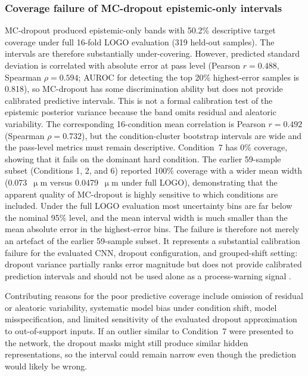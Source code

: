 \subsubsection{Coverage failure of MC-dropout epistemic-only intervals}\label{why-mc-dropout-fails}

MC-dropout produced epistemic-only bands with 50.2\% descriptive target coverage
under full 16-fold LOGO evaluation (319 held-out samples). The intervals
are therefore substantially under-covering. However, predicted standard
deviation is correlated with absolute error at pass level (Pearson
$r=0.488$, Spearman $\rho=0.594$; AUROC for detecting the top 20\%
highest-error samples is 0.818), so MC-dropout has some discrimination
ability but does not provide calibrated predictive intervals. This is not a
formal calibration test of the epistemic posterior variance because the band
omits residual and aleatoric variability. The corresponding 16-condition mean
correlation is Pearson $r=0.492$ (Spearman $\rho=0.732$), but the
condition-cluster bootstrap intervals are wide and the pass-level metrics
must remain descriptive.
Condition~7 has 0\% coverage, showing that it fails on the dominant hard
condition. The earlier 59-sample subset (Conditions 1, 2, and 6)
reported 100\% coverage with a wider mean width (0.073~\(\upmu\)m versus
0.0479~\(\upmu\)m under full LOGO), demonstrating that the apparent quality of
MC-dropout is highly sensitive to which conditions are included. Under the full LOGO evaluation most uncertainty bins are far
below the nominal 95\% level, and the mean interval width is much smaller
than the mean absolute error in the highest-error bins. The failure is
therefore not merely an artefact of the earlier 59-sample subset. It represents a substantial calibration failure for the evaluated CNN, dropout configuration, and grouped-shift setting: dropout variance partially ranks error magnitude but does not
provide calibrated prediction intervals and should not be used alone as a
process-warning signal \cite{ovadia2019can}.

Contributing reasons for the poor predictive coverage include omission of
residual or aleatoric variability, systematic model bias under condition
shift, model misspecification, and limited sensitivity of the evaluated
dropout approximation to out-of-support inputs. If an outlier similar to Condition~7 were presented to the network, the
dropout masks might still produce similar hidden representations, so the
interval could remain narrow even though the prediction would likely be
wrong.

